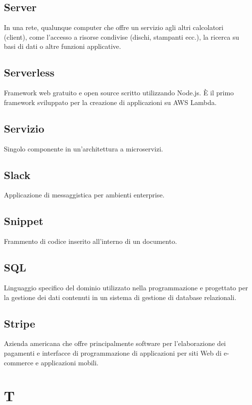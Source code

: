 \subsection*{Server}
In una rete, qualunque computer che offre un servizio agli altri calcolatori (client), come l'accesso a risorse condivise (dischi, stampanti ecc.), la ricerca su basi di dati o altre funzioni applicative.

\subsection*{Serverless}
Framework web gratuito e open source scritto utilizzando Node.js. È il primo framework sviluppato per la creazione di applicazioni su AWS Lambda.

\subsection*{Servizio}
Singolo componente in un'architettura a microservizi.

\subsection*{Slack}
Applicazione di messaggistica per ambienti enterprise.

\subsection*{Snippet}
Frammento di codice inserito all'interno di un documento.

\subsection*{SQL}
Linguaggio specifico del dominio utilizzato nella programmazione e progettato per la gestione dei dati contenuti in un sistema di gestione di database relazionali.

\subsection*{Stripe}
Azienda americana che offre principalmente software per l'elaborazione dei pagamenti e interfacce di programmazione di applicazioni per siti Web di e-commerce e applicazioni mobili.

\newpage
\section{T}

